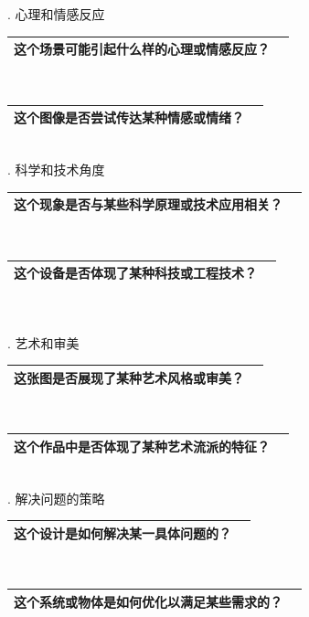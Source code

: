 \documentclass[12pt]{book}
\begin{document}
. 心理和情感反应

\begin{tabular}{|p{15cm}|p{3cm}|}
	\hline
这个场景可能引起什么样的心理或情感反应？\\
	\hline
\end{tabular}\\


\begin{tabular}{|p{15cm}|p{3cm}|}
	\hline
这个图像是否尝试传达某种情感或情绪？\\
	\hline
\end{tabular}\\

. 科学和技术角度

\begin{tabular}{|p{15cm}|p{3cm}|}
	\hline
这个现象是否与某些科学原理或技术应用相关？\\
	\hline
\end{tabular}\\



\begin{tabular}{|p{15cm}|p{3cm}|}
	\hline
这个设备是否体现了某种科技或工程技术？\\
	\hline
\end{tabular}\\\\



. 艺术和审美

\begin{tabular}{|p{15cm}|p{3cm}|}
	\hline
这张图是否展现了某种艺术风格或审美？\\
	\hline
\end{tabular}\\



\begin{tabular}{|p{15cm}|p{3cm}|}
	\hline
这个作品中是否体现了某种艺术流派的特征？\\
	\hline
\end{tabular}\\


. 解决问题的策略

\begin{tabular}{|p{15cm}|p{3cm}|}
	\hline
这个设计是如何解决某一具体问题的？\\
	\hline
\end{tabular}\\


\begin{tabular}{|p{15cm}|p{3cm}|}
	\hline
这个系统或物体是如何优化以满足某些需求的？\\
	\hline
\end{tabular}\\
\end{document}
